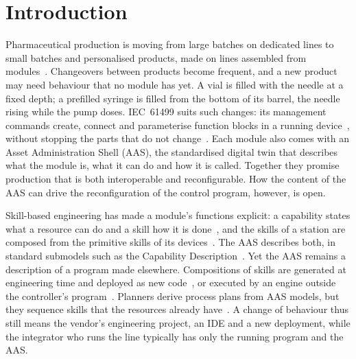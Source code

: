 %

\section{Introduction}
\label{sec:introduction}

Pharmaceutical production is moving from large batches on dedicated lines to small batches and
personalised products, made on lines assembled from modules~\cite{schwoerer2025modular}. Changeovers
between products become frequent, and a new product may need behaviour that no module has yet. A vial
is filled with the needle at a fixed depth; a prefilled syringe is filled from the bottom of its
barrel, the needle rising while the pump doses. IEC~61499 suits such changes: its management commands
create, connect and parameterise function blocks in a running device~\cite{iec61499}, without stopping
the parts that do not change~\cite{rooker2007zero}. Each module also comes with an Asset
Administration Shell (AAS), the standardised digital twin that describes what the module is, what it
can do and how it is called. Together they promise production that is both interoperable and
reconfigurable. How the content of the AAS can drive the reconfiguration of the control program,
however, is open.

Skill-based engineering has made a module's functions explicit: a capability states what a resource
can do and a skill how it is done~\cite{koecher2023reference}, and the skills of a station are
composed from the primitive skills of its devices~\cite{schou2018skill}. The AAS describes both, in
standard submodels such as the Capability Description~\cite{idta02020}. Yet the AAS remains a
description of a program made elsewhere. Compositions of skills are generated at engineering time and
deployed as new code~\cite{dorofeev2021orchestrator}, or executed by an engine outside the controller's
program~\cite{jensen2026service,lindorfer2019user}. Planners derive process plans from AAS models, but
they sequence skills that the resources already have~\cite{nabizada2026capability,schwoerer2026fond}.
A change of behaviour thus
still means the vendor's engineering project, an IDE and a new deployment, while the integrator who
runs the line typically has only the running program and the AAS.

